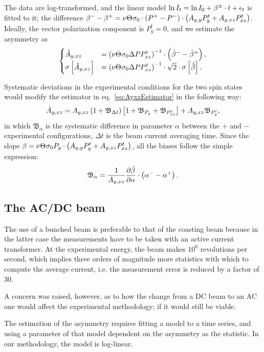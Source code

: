 \documentclass{article}
\newcommand{\bias}[1]{\mathfrak{B}_{#1}}
\begin{document}
The data are log-transformed, and the linear model $\ln I_t = \ln I_0 + \slp^\pm\cdot t + \err_t$ is fitted to it; the difference $\slp^- - \slp^+ = \nu\Thick\CS[0]\cdot\DP*\cdot\bkt{\Ayy P^t_y + \Ayxz P^t_{xz}}$. Ideally, the vector polarization component is $P^t_y = 0$, and we estimate the asymmetry as 
\begin{equation}\label{eq:AyxzEstimator}
\begin{cases}
	\Ayxz* 		&= \bkt{\nu\Thick\CS[0]\DP P^t_{xz}}^{-1}\cdot\bkt{\slp*^- - \slp*^+}, \\
	\SE{\Ayxz*} &= \bkt{\nu\Thick\CS[0]\DP P^t_{xz}}^{-1}\cdot\sqrt2\cdot\SE{\slp*}.
\end{cases}
\end{equation}

\newcommand{\Dt}{\Delta t}
Systematic deviations in the experimental conditions for the two spin states would modify the estimator in eq.~\eqref{eq:AyxzEstimator} in the following way:~\cite{DSPIN}
\begin{equation}\label{eq:AyxzAllBias}
	\Ayxz* = \Ayxz\bkt{1+\bias{\Dt}}\bkt*{1 + \bias{P_y} + \bias{P^t_{xz}}} + \Ayxz\bias{P^t_y},
\end{equation}
in which $\bias{\alpha}$ is the systematic difference in parameter $\alpha$ between the $+$ and $-$ experimental configurations, $\Dt$ is the beam current averaging time. Since the slope $\slp = \nu\Thick\CS[0]P_y\cdot\bkt{\Ayy P^t_y + \Ayxz P^t_{xz}}$, all the biases follow the simple expression:
\begin{equation}
	\bias{\alpha} = \frac{1}{\Ayxz}\frac{\partial\slp*}{\partial\alpha} \cdot \bkt{\alpha^- - \alpha^+}.
\end{equation}

\subsection{The AC/DC beam}
The use of a bunched beam is preferable to that of the coasting beam because in the latter case the measurements have to be taken with an active current transformer. At the experimental energy, the beam makes $10^6$ revolutions per second, which implies three orders of magnitude more statistics with which to compute the average current, i.e. the measurement error is reduced by a factor of $30$.

A concern was raised, however, as to how the change from a DC beam to an AC one would affect the experimental methodology; if it would still be viable.

The estimation of the asymmetry requires fitting a model to a time series, and using a parameter of that model dependent on the asymmetry as the statistic. In our methodology, the model is log-linear. 
\end{document}
